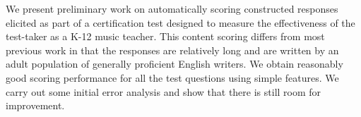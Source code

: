 We present preliminary work on automatically scoring constructed responses elicited as part of a certification test designed to measure the effectiveness of the test-taker as a K-12 music teacher. This content scoring differs from most previous work in that the responses are relatively long and are written by an adult population of generally proficient English writers. We obtain reasonably good scoring performance for all the test questions using simple features. We carry out some initial error analysis and show that there is still room for improvement.
